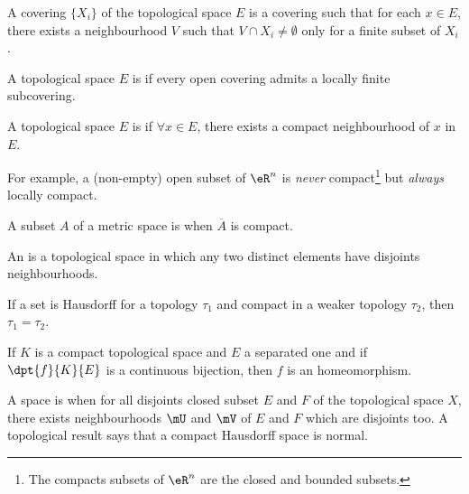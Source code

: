 \begin{definition}
A covering $\{ X_i \}$ of the topological space $E$ is a covering such that for each $x\in E$, there exists a neighbourhood $V$ such that $V\cap X_i\neq \emptyset$ only for a finite subset of $X_i$.
\end{definition}


\begin{definition}	\label{DefParacompact}
A topological space $E$ is  if every open covering admits a locally finite subcovering.
\end{definition}


\begin{definition}
A topological space $E$ is  if $\forall x\in E$, there exists a compact neighbourhood of $x$ in $E$.
\end{definition}

For example, a (non-empty) open subset of $\eR^n$ is \emph{never} compact\footnote{The compacts subsets of $\eR^n$ are the closed and bounded subsets.} but \emph{always} locally compact.

\begin{definition}
A subset $A$ of a metric space is  when $\overline{A}$ is compact.
\end{definition}

\begin{definition}
An  is a topological space in which any two distinct elements have disjoints neighbourhoods.
\end{definition}

\begin{lemma}
If a set is Hausdorff for a topology $\tau_1$ and compact in a weaker topology $\tau_2$, then $\tau_1=\tau_2$.\label{lem:Hausweak}
\end{lemma}

\begin{proposition}
If $K$ is a compact topological space and $E$ a separated one and if $\dpt{f}{K}{E}$ is a continuous bijection, then $f$ is an homeomorphism. \label{lem:wiki}
\end{proposition}

A space is  when for all disjoints closed subset $E$ and $F$ of the topological space $X$, there exists neighbourhoods $\mU$ and $\mV$ of $E$ and $F$ which are disjoints too. A topological result says that a compact Hausdorff space is normal.

